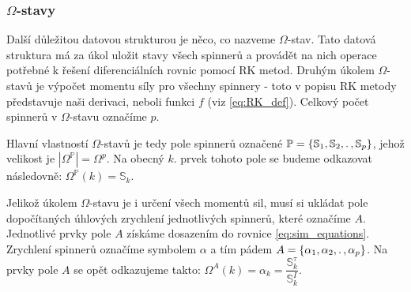 \clearpage

\DFNtrysingle
\DFNinhibitcbreak
{}\textwidth

\subsubsection{$\Omega$-stavy}

Další důležitou datovou strukturou je něco, co nazveme $\Omega$-stav. Tato datová struktura má za úkol uložit stavy všech spinnerů a provádět na nich operace potřebné k řešení diferenciálních rovnic pomocí RK metod. Druhým úkolem $\Omega$-stavů je výpočet momentu síly pro všechny spinnery - toto v popisu RK metody představuje naši derivaci, neboli funkci $f$ (viz \autoref{eq:RK_def}). Celkový počet spinnerů v $\Omega$-stavu označíme $p$.

Hlavní vlastností $\Omega$-stavů je tedy pole spinnerů označené $\mathbb{P} = \{ \mathbb{S}_1, \mathbb{S}_2, \ldotp ,\mathbb{S}_p \}$, jehož velikost je $|\Omega_{}^{\mathbb{P}}| = \Omega_{}^{p}$. Na obecný $k$. prvek tohoto pole se budeme odkazovat následovně: $\Omega_{}^{\mathbb{P}}(k) = \mathbb{S}_k$.

Jelikož úkolem $\Omega$-stavu je i určení všech momentů sil, musí si ukládat pole dopočítaných úhlových zrychlení jednotlivých spinnerů, které označíme $A$. Jednotlivé prvky pole $A$ získáme dosazením do rovnice \ref{eq:sim_equations}. Zrychlení spinnerů označíme symbolem $\alpha$ a tím pádem $A = \{ \alpha_1, \alpha_2, \ldotp, \alpha_p \} $. Na prvky pole $A$ se opět odkazujeme takto: $\Omega_{}^{A}(k) = \alpha_k = \dfrac{\mathbb{S}_k^\tau}{\mathbb{S}_k^I}$.

